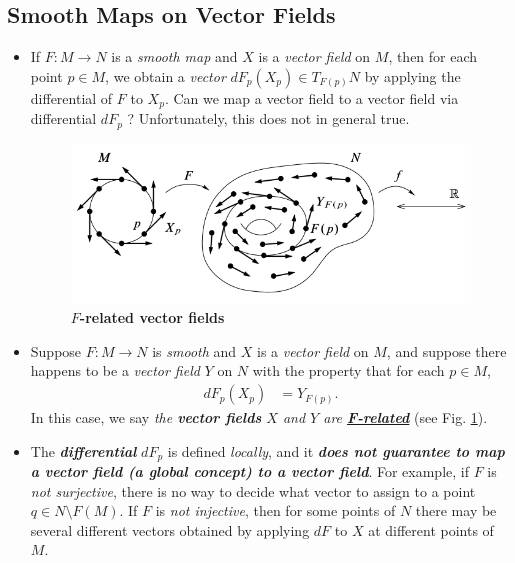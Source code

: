 \documentclass[11pt]{article}
\begin{document}
\subsection{Smooth Maps on Vector Fields}
\begin{itemize}
\item \begin{remark}
If $F: M \rightarrow N$ is a \emph{smooth map} and $X$ is a \emph{vector field} on $M$, then for each point $p \in M$, we obtain a \emph{vector} $dF_{p}(X_p) \in T_{F(p)}N$ by applying the differential of $F$ to $X_p$. Can we map a vector field to a vector field via differential $dF_{p}$ ? Unfortunately, this does not in general true. 
\end{remark}

\begin{figure}
\begin{minipage}[htb]{1\linewidth}
  \centering
  \centerline{\includegraphics[scale = 0.5]{F_related_vector_fields.png}}
\end{minipage}
\caption{\footnotesize{\textbf{$F$-related vector fields \citep{lee2003introduction}}}}
\label{fig: F_related_vector_fields}
\end{figure}

\item 
\begin{definition}
Suppose $F: M \rightarrow N$ is \emph{smooth} and $X$ is a \emph{vector field} on $M$,  and suppose there happens to be a \emph{vector field} $Y$ on $N$ with the property that for each $p \in M$,
\begin{align*}
dF_{p}(X_p) &= Y_{F(p)}.
\end{align*}
 In this case, we say \emph{the \textbf{vector fields} $X$ and $Y$ are \underline{\textbf{F-related}}} (see Fig. \ref{fig: F_related_vector_fields}). 
\end{definition}

\item \begin{remark}
The \emph{\textbf{differential}} $dF_{p}$ is defined \emph{locally}, and it \emph{\textbf{does not guarantee to map a vector field (a global concept) to a vector field}}.  For example,
if $F$ is \emph{not surjective}, there is no way to decide what vector to assign to a point $q \in N \setminus F(M)$.  If $F$ is \emph{not injective}, then for some points of $N$ there may be several different vectors obtained by applying $dF$ to $X$ at different points of $M$.
\end{remark}


\end{itemize}
\end{document}
